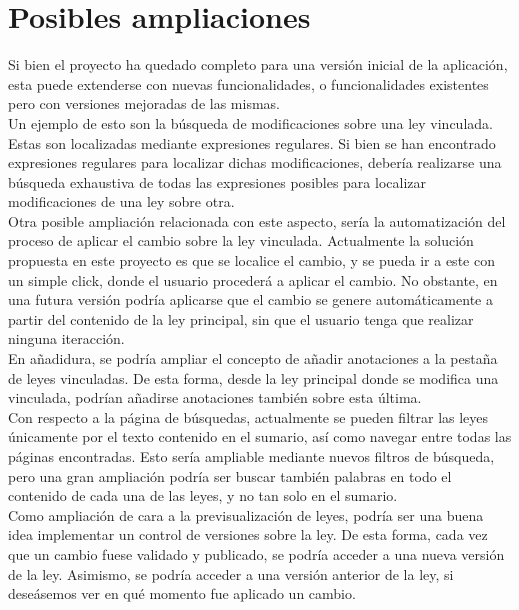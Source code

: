 \section{Posibles ampliaciones}

Si bien el proyecto ha quedado completo para una versión inicial de la aplicación, esta puede extenderse con nuevas funcionalidades, o funcionalidades existentes pero con versiones mejoradas de las mismas.
\\

Un ejemplo de esto son la búsqueda de modificaciones sobre una ley vinculada. Estas son localizadas mediante expresiones regulares. Si bien se han encontrado expresiones regulares para localizar dichas modificaciones, debería realizarse una búsqueda exhaustiva de todas las expresiones posibles para localizar modificaciones de una ley sobre otra.
\\

Otra posible ampliación relacionada con este aspecto, sería la automatización del proceso de aplicar el cambio sobre la ley vinculada. Actualmente la solución propuesta en este proyecto es que se localice el cambio, y se pueda ir a este con un simple click, donde el usuario procederá a aplicar el cambio. No obstante, en una futura versión podría aplicarse que el cambio se genere automáticamente a partir del contenido de la ley principal, sin que el usuario tenga que realizar ninguna iteracción.
\\

En añadidura, se podría ampliar el concepto de añadir anotaciones a la pestaña de leyes vinculadas. De esta forma, desde la ley principal donde se modifica una vinculada, podrían añadirse anotaciones también sobre esta última.
\\

Con respecto a la página de búsquedas, actualmente se pueden filtrar las leyes únicamente por el texto contenido en el sumario, así como navegar entre todas las páginas encontradas. Esto sería ampliable mediante nuevos filtros de búsqueda, pero una gran ampliación podría ser buscar también palabras en todo el contenido de cada una de las leyes, y no tan solo en el sumario.
\\

Como ampliación de cara a la previsualización de leyes, podría ser una buena idea implementar un control de versiones sobre la ley. De esta forma, cada vez que un cambio fuese validado y publicado, se podría acceder a una nueva versión de la ley. Asimismo, se podría acceder a una versión anterior de la ley, si deseásemos ver en qué momento fue aplicado un cambio.
\\

